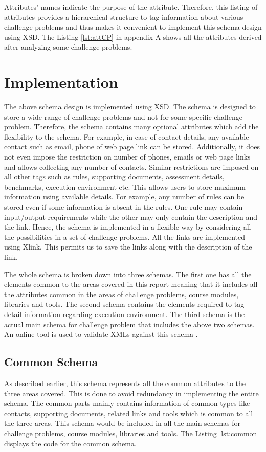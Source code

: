\documentclass[11pt,letterpaper]{report}
\begin{document}
Attributes' names indicate the purpose of the attribute. Therefore, this listing of attributes provides a hierarchical structure to tag information about various challenge problems and thus makes it convenient to implement this schema design using XSD. The Listing \ref{lst:attCP} in appendix A shows all the attributes derived after analyzing some challenge problems.

\section{Implementation}
The above schema design is implemented using XSD. The schema is designed to store a wide range of challenge problems and not for some specific challenge problem. Therefore, the schema contains many optional attributes which add the flexibility to the schema. For example, in case of contact details, any available contact such as email, phone of web page link can be stored. Additionally, it does not even impose the restriction on number of phones, emails or web page links and allows collecting any number of contacts. Similar restrictions are imposed on all other tags such as rules, supporting documents, assessment details, benchmarks, execution environment etc. This allows users to store maximum information using available details. For example, any number of rules can be stored even if some information is absent in the rules. One rule may contain input/output requirements while the other may only contain the description and the link. Hence, the schema is implemented in a flexible way by considering all the possibilities in a set of challenge problems. All the links are implemented using Xlink. This permits us to save the links along with the description of the link.    

The whole schema is broken down into three schemas. The first one has all the elements common to the areas covered in this report meaning that it includes all the attributes common in the areas of challenge problems, course modules, libraries and tools. The second schema contains the elements required to tag detail information regarding execution environment. The third schema is the actual main schema for challenge problem that includes the above two schemas. An online tool is used to validate XMLs against this schema \cite{olXSD}.

\subsection{Common Schema}
As described earlier, this schema represents all the common attributes to the three areas covered. This is done to avoid redundancy in implementing the entire schema. The common parts mainly contains information of common types like contacts, supporting documents, related links and tools which is common to all the three areas. This schema would be included in all the main schemas for challenge problems, course modules, libraries and tools. The Listing \ref{lst:common} displays the code for the common schema.     
\end{document}
